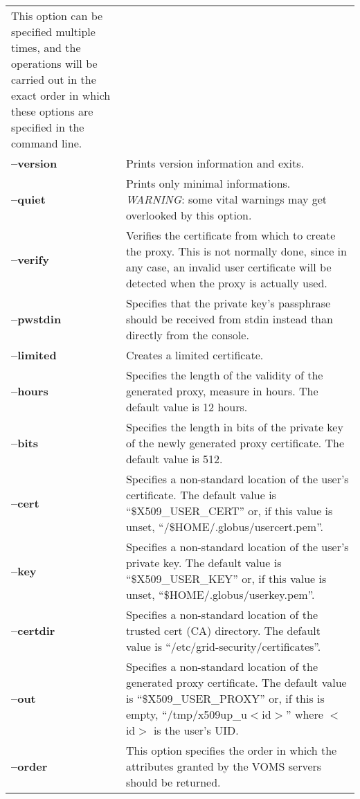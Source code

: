 \documentclass[a4paper]{book}
\begin{document}
\begin{longtable}{lp{3in}}
		      This option can be specified multiple times, and
		      the operations will be carried out in the exact
		      order in which these options are specified in the
		      command line.\\
\textbf{--version}  & Prints version information and exits.\\
\textbf{--quiet}    & Prints only minimal informations.
		      \emph{WARNING}: some vital warnings may get
		      overlooked by this option.\\
\textbf{--verify}   & Verifies the certificate from which to create the
		      proxy.  This is not normally done, since in any
		      case, an invalid user certificate will be
		      detected when the proxy is actually used.\\
\textbf{--pwstdin}  & Specifies that the private key's passphrase
		      should be received from stdin instead than
		      directly from the console.\\
\textbf{--limited}  & Creates a limited certificate.\\
\textbf{--hours}    & Specifies the length of the validity of the
		      generated proxy, measure in hours.  The default
		      value is 12 hours.\\
\textbf{--bits}     & Specifies the length in bits of the private key
		      of the newly generated proxy certificate.  The
		      default value is 512.\\
\textbf{--cert}     & Specifies a non-standard location of the user's
		      certificate.  The default value is
		      ``\$X509\_USER\_CERT'' or, if this value is unset,
		      ``/\$HOME/.globus/usercert.pem''.\\
\textbf{--key}      & Specifies a non-standard location of the user's
		      private key.  The default value is
		      ``\$X509\_USER\_KEY'' or, if this value is unset,
		      ``\$HOME/.globus/userkey.pem''.\\
\textbf{--certdir}  & Specifies a non-standard location of the trusted
		      cert (CA) directory.  The default value is
		      ``/etc/grid-security/certificates''.\\ 
\textbf{--out}      & Specifies a non-standard location of the
		      generated proxy certificate.  The default value
		      is ``\$X509\_USER\_PROXY'' or, if this is empty,
		      ``/tmp/x509up\_u$<$id$>$'' where $<$id$>$ is the
		      user's UID.\\
\textbf{--order}    & This option specifies the order in which the
		      attributes granted by the VOMS servers should be
		      returned.  


\end{longtable}
\end{document}
